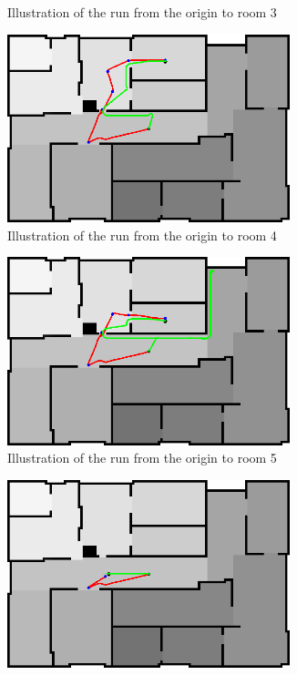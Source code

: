\documentclass[../Head/Main.tex]{subfiles}
\begin{document}
\begin{figure}[H]
\begin{subfigure}[b]{0.49\textwidth}
    \caption{Illustration of the run from the origin to room 3}
    \label{fig:Test3}
  \end{subfigure}
  \hfill
  \begin{subfigure}[b]{0.49\textwidth}
    \centering
    \includegraphics[width=0.9\textwidth]{brushfireAndBugTest4}
    \caption{Illustration of the run from the origin to room 4}
    \label{fig:Test4}
  \end{subfigure}
  \hfill
  \begin{subfigure}[b]{0.49\textwidth}
    \centering
    \includegraphics[width=0.9\textwidth]{brushfireAndBugTest5}
    \caption{Illustration of the run from the origin to room 5}
    \label{fig:Test5}
  \end{subfigure}
  \hfill
  \begin{subfigure}[b]{0.49\textwidth}
    \centering
    \includegraphics[width=0.9\textwidth]{brushfireAndBugTest6}

\end{subfigure}
\end{figure}
\end{document}
